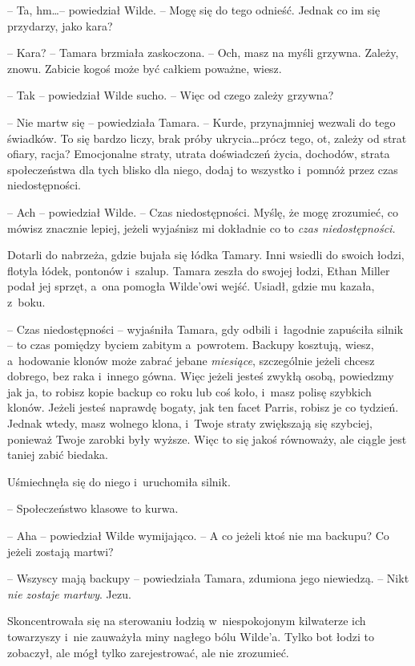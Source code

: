 \documentclass[oneside,polish,11pt,sfheadings]{mwbk}
\begin{document}
-- Ta, hm\ldots -- powiedział Wilde. -- Mogę się do tego odnieść. Jednak co im
się przydarzy, jako kara?

-- Kara? -- Tamara brzmiała zaskoczona. -- Och, masz na myśli grzywna.
Zależy, znowu. Zabicie kogoś może być całkiem poważne, wiesz.

-- Tak -- powiedział Wilde sucho. -- Więc od czego zależy grzywna?

-- Nie martw się -- powiedziała Tamara. -- Kurde, przynajmniej wezwali do
tego świadków. To się bardzo liczy, brak próby ukrycia\ldots prócz tego, ot, 
zależy od strat ofiary, racja? Emocjonalne straty, utrata doświadczeń
życia, dochodów, strata społeczeństwa dla tych blisko dla niego, dodaj
to wszystko i~pomnóż przez czas niedostępności.

-- Ach -- powiedział Wilde. -- Czas niedostępności. Myślę, że mogę
zrozumieć, co mówisz znacznie lepiej, jeżeli wyjaśnisz mi dokładnie co
to \emph{czas niedostępności.}

Dotarli do nabrzeża, gdzie bujała się łódka Tamary. Inni wsiedli do
swoich łodzi, flotyla łódek, pontonów i~szalup. Tamara zeszła do swojej
łodzi, Ethan Miller podał jej sprzęt, a~ona pomogła Wilde'owi wejść.
Usiadł, gdzie mu kazała, z~boku.

-- Czas niedostępności -- wyjaśniła Tamara, gdy odbili i~łagodnie
zapuściła silnik -- to czas pomiędzy byciem zabitym a~powrotem. Backupy
kosztują, wiesz, a~hodowanie klonów może zabrać jebane \emph{miesiące},
szczególnie jeżeli chcesz dobrego, bez raka i~innego gówna. Więc jeżeli
jesteś zwykłą osobą, powiedzmy jak ja, to robisz kopie backup co roku
lub coś koło, i~masz polisę szybkich klonów. Jeżeli jesteś naprawdę
bogaty, jak ten facet Parris, robisz je co tydzień. Jednak wtedy, masz
wolnego klona, i~Twoje straty zwiększają się szybciej, ponieważ Twoje
zarobki były wyższe. Więc to się jakoś równoważy, ale ciągle jest taniej
zabić biedaka.

Uśmiechnęła się do niego i~uruchomiła silnik. 

-- Społeczeństwo klasowe to
kurwa.

-- Aha -- powiedział Wilde wymijająco. -- A co jeżeli ktoś nie ma backupu?
Co jeżeli zostają martwi?

-- Wszyscy mają backupy -- powiedziała Tamara, zdumiona jego niewiedzą. -- Nikt \emph{nie zostaje martwy}. Jezu.

Skoncentrowała się na sterowaniu łodzią w~niespokojonym kilwaterze ich
towarzyszy i~nie zauważyła miny nagłego bólu Wilde'a. Tylko bot łodzi to
zobaczył, ale mógł tylko zarejestrować, ale nie zrozumieć.
\end{document}
